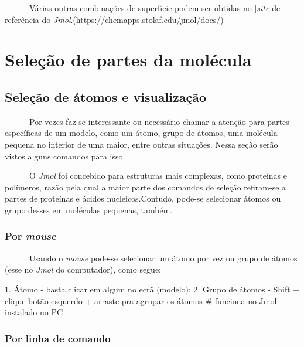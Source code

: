 \documentclass[
  letterpaper,
  DIV=11,
  numbers=noendperiod]{scrreprt}
\newenvironment{Shaded}{\begin{snugshade}}{\end{snugshade}}
\newcommand{\CommentTok}[1]{\textcolor[rgb]{0.37,0.37,0.37}{#1}}
\newcommand{\FloatTok}[1]{\textcolor[rgb]{0.68,0.00,0.00}{#1}}
\newcommand{\NormalTok}[1]{\textcolor[rgb]{0.00,0.23,0.31}{#1}}
\newcommand{\SpecialCharTok}[1]{\textcolor[rgb]{0.37,0.37,0.37}{#1}}
\begin{document}
~~~~~~Várias outras combinações de superfície podem ser obtidas no
{[}\emph{site} de referência do
\emph{Jmol}.(https://chemapps.stolaf.edu/jmol/docs/)


\chapter{Seleção de partes da
molécula}\label{seleuxe7uxe3o-de-partes-da-moluxe9cula}

\section{Seleção de átomos e
visualização}\label{seleuxe7uxe3o-de-uxe1tomos-e-visualizauxe7uxe3o}

~~~~~~Por vezes faz-se interessante ou necessário chamar a atenção para
partes específicas de um modelo, como um átomo, grupo de átomos, uma
molécula pequena no interior de uma maior, entre outras situações. Nessa
seção serão vistos alguns comandos para isso.

~~~~~~O \emph{Jmol} foi concebido para estruturas mais complexas, como
proteínas e polímeros, razão pela qual a maior parte dos comandos de
seleção refiram-se a partes de proteínas e ácidos nucleicos.Contudo,
pode-se selecionar átomos ou grupo desses em moléculas pequenas, também.

\subsection{\texorpdfstring{Por
\emph{mouse}}{Por mouse}}\label{por-mouse}

~~~~~~Usando o \emph{mouse} pode-se selecionar um átomo por vez ou grupo
de átomos (esse no \emph{Jmol} do computador), como segue:

\begin{Shaded}
\begin{Highlighting}[]
\FloatTok{1.}\NormalTok{ Átomo }\SpecialCharTok{{-}}\NormalTok{ basta clicar em algum no ecrã (modelo);}
\FloatTok{2.}\NormalTok{ Grupo de átomos }\SpecialCharTok{{-}}\NormalTok{ Shift }\SpecialCharTok{+}\NormalTok{ clique botão esquerdo }\SpecialCharTok{+}\NormalTok{ arraste pra agrupar os átomos }\CommentTok{\# funciona no Jmol instalado no PC}
\end{Highlighting}
\end{Shaded}

\subsection{Por linha de comando}\label{por-linha-de-comando}
\end{document}
